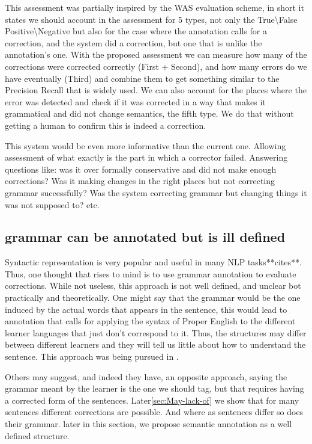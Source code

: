 \documentclass[english]{article}
\begin{document}
This assessment was partially inspired by the WAS evaluation scheme\cite{chodorow2012problems},
in short it states we should account in the assessment for 5 types,
not only the True\textbackslash{}False Positive\textbackslash{}Negative
but also for the case where the annotation calls for a correction,
and the system did a correction, but one that is unlike the annotation's
one. With the proposed assessment we can measure how many of the corrections
were corrected correctly (First + Second), and how many errors do
we have eventually (Third) and combine them to get something similar
to the Precision Recall that is widely used. We can also account for
the places where the error was detected and check if it was corrected
in a way that makes it grammatical and did not change semantics, the
fifth type. We do that without getting a human to confirm this is
indeed a correction.

This system would be even more informative than the current one. Allowing assessment of
what exactly is the part in which a corrector failed. Answering questions
like: was it over formally conservative and did not make enough corrections?
Was it making changes in the right places but not correcting grammar
successfully? Was the system correcting grammar but changing things
it was not supposed to? etc.

\subsection{grammar can be annotated but is ill defined}

Syntactic representation is very popular and useful in many NLP tasks{*}{*}cites{*}{*}.
Thus, one thought that rises to mind is to use grammar annotation
to evaluate corrections. While not useless, this approach is not well
defined, and unclear bot practically and theoretically. One might
say that the grammar would be the one induced by the actual words
that appears in the sentence, this would lead to annotation that calls
for applying the syntax of Proper English to the different learner
languages that just don't correspond to it. Thus, the structures may
differ between different learners and they will tell us little about
how to understand the sentence. This approach was being pursued in
\cite{berzak2016universal}. 

Others may suggest, and indeed they have\cite{nagataphrase}, an opposite
approach, saying the grammar meant by the learner is the one we should
tag, but that requires having a corrected form of the sentences. Later\ref{sec:May-lack-of}
we show that for many sentences different corrections are possible.
And where as sentences differ so does their grammar. later in this
section, we propose semantic annotation as a well defined structure.
\end{document}
